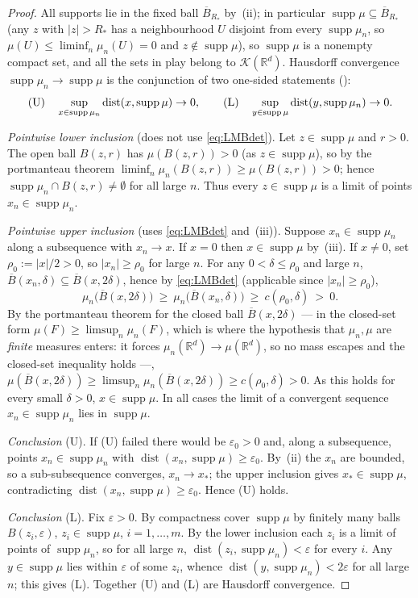 \documentclass[11pt]{article}
\theoremstyle{definition}
\theoremstyle{remark}
\newcommand{\R}{\mathbb{R}}
\newcommand{\supp}{\operatorname{supp}}
\newcommand{\dist}{\operatorname{dist}}
\newcommand{\eps}{\varepsilon}
\numberwithin{equation}{section}
\theoremstyle{plain}
\theoremstyle{definition}
\theoremstyle{remark}
\theoremstyle{plain}
\begin{document}
\begin{proof}
All supports lie in the fixed ball $\overline B_{R_\ast}$ by~(ii); in
particular $\supp\mu\subseteq\overline B_{R_\ast}$ (any $z$ with $|z|>R_\ast$ has
a neighbourhood $U$ disjoint from every $\supp\mu_n$, so $\mu(U)\le\liminf_n
\mu_n(U)=0$ and $z\notin\supp\mu$), so $\supp\mu$ is a nonempty compact set, and
all the sets in play belong to $\mathcal K(\R^d)$. Hausdorff convergence
$\supp\mu_n\to\supp\mu$ is the conjunction of two one-sided statements
(\cite[\S 12.3]{SW08}):
\[
\textup{(U)}\quad\sup_{x\in\supp\mu_n}\dist(x,\supp\mu)\to0,
\qquad
\textup{(L)}\quad\sup_{y\in\supp\mu}\dist(y,\supp\mu_n)\to0 .
\]

\emph{Pointwise lower inclusion} (does not use \eqref{eq:LMBdet}). Let
$z\in\supp\mu$ and $r>0$. The open ball $B(z,r)$ has $\mu(B(z,r))>0$ (as
$z\in\supp\mu$), so by the portmanteau theorem
$\liminf_n\mu_n(B(z,r))\ge\mu(B(z,r))>0$; hence
$\supp\mu_n\cap B(z,r)\neq\emptyset$ for all large $n$. Thus every
$z\in\supp\mu$ is a limit of points $x_n\in\supp\mu_n$.

\emph{Pointwise upper inclusion} (uses \eqref{eq:LMBdet} and~(iii)).
Suppose $x_n\in\supp\mu_{n}$ along a subsequence with $x_n\to x$. If $x=0$ then
$x\in\supp\mu$ by~(iii). If $x\neq0$, set $\rho_0:=|x|/2>0$, so $|x_n|\ge\rho_0$
for large $n$. For any $0<\delta\le\rho_0$ and large $n$,
$\overline B(x_n,\delta)\subseteq\overline B(x,2\delta)$, hence by
\eqref{eq:LMBdet} (applicable since $|x_n|\ge\rho_0$),
\[
\mu_n\bigl(\overline B(x,2\delta)\bigr)\ \ge\
\mu_n\bigl(\overline B(x_n,\delta)\bigr)\ \ge\ c(\rho_0,\delta)\ >\ 0 .
\]
By the portmanteau theorem for the closed ball $\overline B(x,2\delta)$
--- in the closed-set form $\mu(F)\ge\limsup_n\mu_n(F)$, which is where the
hypothesis that $\mu_n,\mu$ are \emph{finite} measures enters: it forces
$\mu_n(\R^d)\to\mu(\R^d)$, so no mass escapes and the closed-set inequality
holds ---,
$\mu(\overline B(x,2\delta))\ge\limsup_n\mu_n(\overline B(x,2\delta))\ge
c(\rho_0,\delta)>0$. As this holds for every small $\delta>0$,
$x\in\supp\mu$. In all cases the limit of a convergent sequence
$x_n\in\supp\mu_n$ lies in $\supp\mu$.

\emph{Conclusion} \textup{(U)}. If \textup{(U)} failed there would be
$\eps_0>0$ and, along a subsequence, points $x_n\in\supp\mu_n$ with
$\dist(x_n,\supp\mu)\ge\eps_0$. By~(ii) the $x_n$ are bounded, so a
sub-subsequence converges, $x_n\to x_\ast$; the upper inclusion gives
$x_\ast\in\supp\mu$, contradicting $\dist(x_n,\supp\mu)\ge\eps_0$. Hence
\textup{(U)} holds.

\emph{Conclusion} \textup{(L)}. Fix $\eps>0$. By compactness cover
$\supp\mu$ by finitely many balls $B(z_i,\eps)$, $z_i\in\supp\mu$,
$i=1,\dots,m$. By the lower inclusion each $z_i$ is a limit of points of
$\supp\mu_n$, so for all large $n$, $\dist(z_i,\supp\mu_n)<\eps$ for every $i$.
Any $y\in\supp\mu$ lies within $\eps$ of some $z_i$, whence
$\dist(y,\supp\mu_n)<2\eps$ for all large $n$; this gives \textup{(L)}. Together
\textup{(U)} and \textup{(L)} are Hausdorff convergence.
\end{proof}
\end{document}
